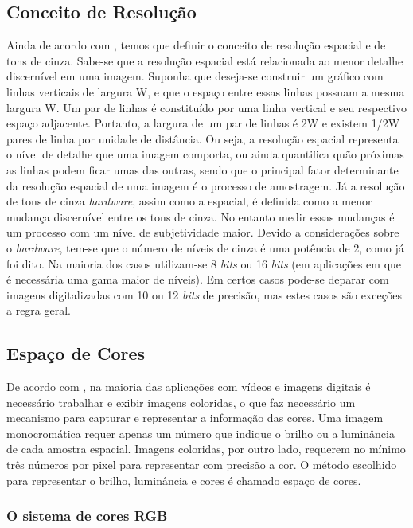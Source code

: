 \subsection{Conceito de Resolução} \label{resolucao}


Ainda de acordo com \cite{gonzalez2004digital}, temos que definir o conceito de resolução espacial e de tons de cinza. Sabe-se que a resolução espacial está relacionada ao menor detalhe discernível em uma imagem. Suponha que deseja-se construir um gráfico com linhas verticais de largura W, e que o espaço entre essas linhas possuam a mesma largura W. Um par de linhas é constituído por uma linha vertical e seu respectivo espaço adjacente. Portanto, a largura de um par de linhas é 2W e existem 1/2W pares de linha por unidade de distância. Ou seja, a resolução espacial representa o nível de detalhe que uma imagem comporta, ou ainda quantifica quão próximas as linhas podem ficar umas das outras, sendo que o principal fator determinante da resolução espacial de uma imagem é o processo de amostragem. Já a resolução de tons de cinza \textit{hardware}, assim como a espacial, é definida como a menor mudança discernível entre os tons de cinza. No entanto medir essas mudanças é um processo com um nível de subjetividade maior. Devido a considerações sobre o \textit{hardware}, tem-se que o número de níveis de cinza é uma potência de 2, como já foi dito. Na maioria dos casos utilizam-se 8 \textit{bits} ou 16 \textit{bits} (em aplicações em que é necessária uma gama maior de níveis). Em certos casos pode-se deparar com imagens digitalizadas com 10 ou 12 \textit{bits} de precisão, mas estes casos são exceções a regra geral.


\subsection{Espaço de Cores}

De acordo com \cite{richardson2011h}, na maioria das aplicações com vídeos e imagens digitais é necessário trabalhar e exibir imagens coloridas, o que faz necessário um mecanismo para capturar e representar a informação das cores. Uma imagem monocromática requer apenas um número que indique o brilho ou a luminância de cada amostra espacial. Imagens coloridas, por outro lado, requerem no mínimo três números por pixel para representar com precisão a cor. O método escolhido para representar o brilho, luminância e cores é chamado espaço de cores.

\subsubsection{O sistema de cores RGB}

